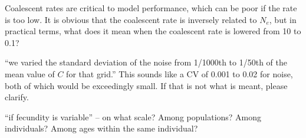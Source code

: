 
\begin{point}{}
    Coalescent rates are critical to model performance, which can be poor if the
    rate is too low.  It is obvious that the coalescent rate is inversely
    related to $N_e$, but in practical terms, what does it mean when the
    coalescent rate is lowered from 10 to 0.1?
\end{point}


\begin{point}{\revref}
    ``we varied the standard deviation of the noise from 1/1000th to 1/50th of
    the mean value of $C$ for that grid.''  This sounds like a CV of 0.001 to
    0.02 for noise, both of which would be exceedingly small.  If that is not
    what is meant, please clarify. \revref
\end{point}


\begin{point}{\revref}
    ``if fecundity is variable'' -- on what scale?  Among populations?  Among
    individuals?  Among ages within the same individual? 
\end{point}


